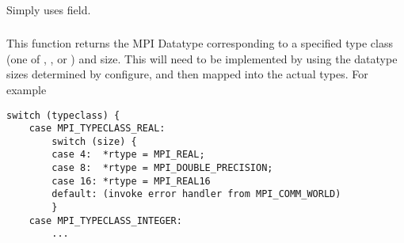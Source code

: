 \documentclass{article}
\begin{document}
\\
\\
\\
\\
\\
\\
\\
\\
\\
\\
\\
\\
\\
\\
\\
\\
\\
\\

\subsubsection{}
Simply uses  field.

\subsubsection{}
This function returns the MPI Datatype corresponding to a specified type class
(one of , , or
) and size.  This will need to be implemented
by using the datatype sizes determined by configure, and then mapped into 
the actual types.  For example
\begin{verbatim}
switch (typeclass) {
    case MPI_TYPECLASS_REAL:
        switch (size) {
        case 4:  *rtype = MPI_REAL;
        case 8:  *rtype = MPI_DOUBLE_PRECISION;
        case 16: *rtype = MPI_REAL16
        default: (invoke error handler from MPI_COMM_WORLD)
        }
    case MPI_TYPECLASS_INTEGER:
        ...
\end{verbatim}
\end{document}

